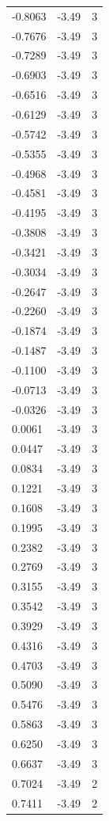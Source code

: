 \begin{longtable}{lrr}
  -0.8063 & -3.49 & 3 \\
  -0.7676 & -3.49 & 3 \\
  -0.7289 & -3.49 & 3 \\
  -0.6903 & -3.49 & 3 \\
  -0.6516 & -3.49 & 3 \\
  -0.6129 & -3.49 & 3 \\
  -0.5742 & -3.49 & 3 \\
  -0.5355 & -3.49 & 3 \\
  -0.4968 & -3.49 & 3 \\
  -0.4581 & -3.49 & 3 \\
  -0.4195 & -3.49 & 3 \\
  -0.3808 & -3.49 & 3 \\
  -0.3421 & -3.49 & 3 \\
  -0.3034 & -3.49 & 3 \\
  -0.2647 & -3.49 & 3 \\
  -0.2260 & -3.49 & 3 \\
  -0.1874 & -3.49 & 3 \\
  -0.1487 & -3.49 & 3 \\
  -0.1100 & -3.49 & 3 \\
  -0.0713 & -3.49 & 3 \\
  -0.0326 & -3.49 & 3 \\
  0.0061 & -3.49 & 3 \\
  0.0447 & -3.49 & 3 \\
  0.0834 & -3.49 & 3 \\
  0.1221 & -3.49 & 3 \\
  0.1608 & -3.49 & 3 \\
  0.1995 & -3.49 & 3 \\
  0.2382 & -3.49 & 3 \\
  0.2769 & -3.49 & 3 \\
  0.3155 & -3.49 & 3 \\
  0.3542 & -3.49 & 3 \\
  0.3929 & -3.49 & 3 \\
  0.4316 & -3.49 & 3 \\
  0.4703 & -3.49 & 3 \\
  0.5090 & -3.49 & 3 \\
  0.5476 & -3.49 & 3 \\
  0.5863 & -3.49 & 3 \\
  0.6250 & -3.49 & 3 \\
  0.6637 & -3.49 & 3 \\
  0.7024 & -3.49 & 2 \\
  0.7411 & -3.49 & 2 \\

\end{longtable}

